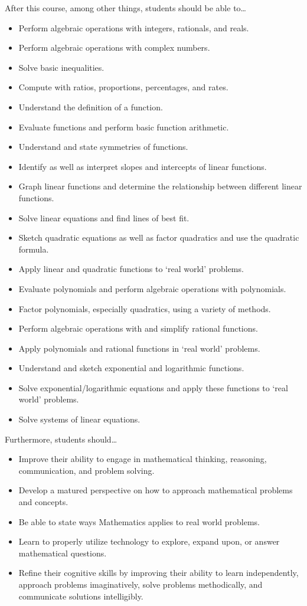 \documentclass[11pt,letterpaper]{article}
\begin{document}
After this course, among other things, students should be able to\dots
	\begin{itemize} \itemsep=0.3ex
	\item Perform algebraic operations with integers, rationals, and reals. 
	\item Perform algebraic operations with complex numbers.
	\item Solve basic inequalities.
	\item Compute with ratios, proportions, percentages, and rates. 
	\item Understand the definition of a function.
	\item Evaluate functions and perform basic function arithmetic. 
	\item Understand and state symmetries of functions.
	\item Identify as well as interpret slopes and intercepts of linear functions.
	\item Graph linear functions and determine the relationship between different linear functions.
	\item Solve linear equations and find lines of best fit.
	\item Sketch quadratic equations as well as factor quadratics and use the quadratic formula.
	\item Apply linear and quadratic functions to `real world' problems.  
	\item Evaluate polynomials and perform algebraic operations with polynomials.
	\item Factor polynomials, especially quadratics, using a variety of methods.
	\item Perform algebraic operations with and simplify rational functions. 
	\item Apply polynomials and rational functions in `real world' problems.
	\item Understand and sketch exponential and logarithmic functions.
	\item Solve exponential/logarithmic equations and apply these functions to `real world' problems.
	\item Solve systems of linear equations. 
	\end{itemize}
Furthermore, students should\dots
	\begin{itemize} \itemsep=0.3ex
	\item  Improve their ability to engage in mathematical thinking, reasoning, communication, and problem solving.
	\item Develop a matured perspective on how to approach mathematical problems and concepts.
	\item Be able to state ways Mathematics applies to real world problems.
	\item Learn to properly utilize technology to explore, expand upon, or answer mathematical questions.
	\item Refine their cognitive skills by improving their ability to learn independently, approach problems imaginatively, solve problems methodically, and communicate solutions intelligibly.
	\end{itemize}
\sectionbreak
\end{document}

